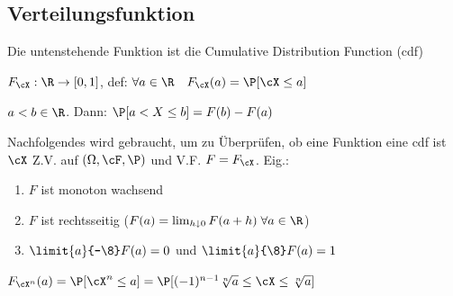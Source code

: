 \subsection{Verteilungsfunktion}
\label{sec:distribution-function}
{\scriptsize Die untenstehende Funktion ist die Cumulative Distribution Function (cdf)}

\shortdefinition $F_\cX : \R \rightarrow [0, 1]$, def: $\forall a \in \R \quad F_\cX(a) = \P[\cX \leq a]$

\shorttheorem $a < b \in \R$. Dann: $\P[a < X \leq b] = F(b) - F(a)$

{\scriptsize Nachfolgendes wird gebraucht, um zu Überprüfen, ob eine Funktion eine cdf ist}\\
\shorttheorem $\cX$ Z.V. auf $(\Omega, \cF, \P)$ und V.F. $F = F_\cX$. Eig.:
\begin{enumerate}
    \item $F$ ist monoton wachsend
    \item $F$ ist rechtsseitig ($F(a) = \lim_{h \downarrow 0} F(a + h) \; \forall a \in \R$)
    \item $\limit{a}{-\8} F(a) = 0$ und $\limit{a}{\8} F(a) = 1$
\end{enumerate}

$F_{\cX^n}(a) = \P[\cX^n \leq a] = \P[(-1)^{n - 1}\sqrt[n]{a} \leq \cX \leq \sqrt[n]{a}]$
